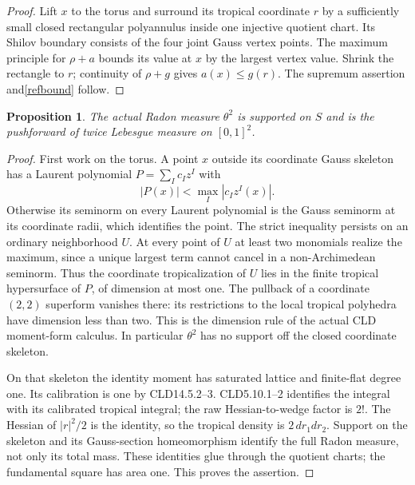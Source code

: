 \documentclass[11pt]{article}
\newtheorem{proposition}[theorem]{Proposition}
\theoremstyle{remark}\newtheorem{remark}[theorem]{Remark}
\begin{document}
\begin{proof}
Lift $x$ to the torus and surround its tropical coordinate $r$
by a sufficiently small closed rectangular polyannulus inside
one injective quotient chart. Its Shilov boundary consists of the
four joint Gauss vertex points. The maximum principle for
$\rho+a$ bounds its value at $x$ by the largest vertex value.
Shrink the rectangle to $r$; continuity of $\rho+g$ gives
$a(x)\le g(r)$. The supremum assertion and\eqref{refbound} follow.
\end{proof}

\begin{proposition}\label{refmeasure}
The actual Radon measure $\theta^2$ is supported on $S$ and is
the pushforward of twice Lebesgue measure on $[0,1]^2$.
\end{proposition}
\begin{proof}
First work on the torus. A point $x$ outside its coordinate
Gauss skeleton has a Laurent polynomial $P=\sum_Ic_Iz^I$ with
\[
 |P(x)|<\max_I|c_Iz^I(x)|.
\]
Otherwise its seminorm on every Laurent polynomial is the Gauss
seminorm at its coordinate radii, which identifies the point.
The strict inequality persists on an ordinary neighborhood $U$.
At every point of $U$ at least two monomials realize the maximum,
since a unique largest term cannot cancel in a non-Archimedean
seminorm. Thus the coordinate tropicalization of $U$ lies in the
finite tropical hypersurface of $P$, of dimension at most one.
The pullback of a coordinate $(2,2)$ superform vanishes there:
its restrictions to the local tropical polyhedra have dimension
less than two. This is the dimension rule of the actual CLD
moment-form calculus. In particular $\theta^2$ has no support
off the closed coordinate skeleton.

On that skeleton the identity moment has saturated lattice and
finite-flat degree one. Its calibration is one by CLD14.5.2--3.
CLD5.10.1--2 identifies the integral with its calibrated tropical
integral; the raw Hessian-to-wedge factor is $2!$.
The Hessian of $|r|^2/2$ is the identity, so the tropical density
is $2\,dr_1dr_2$. Support on the skeleton and its Gauss-section
homeomorphism identify the full Radon measure, not only its
total mass. These identities glue through the quotient charts;
the fundamental square has area one. This proves the assertion.
\end{proof}
\end{document}
